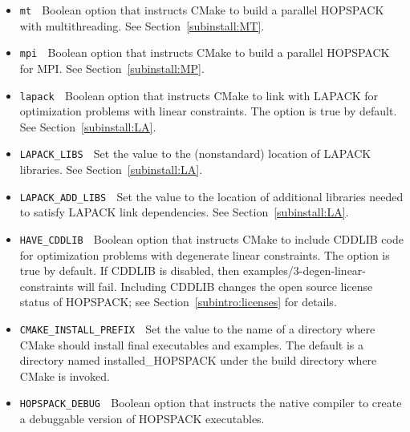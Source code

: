 \begin{itemize}
  \item {\tt mt} $\;$
      Boolean option that instructs CMake to build a parallel HOPSPACK with
      multithreading.  See Section~\ref{subinstall:MT}.
  \item {\tt mpi} $\;$
      Boolean option that instructs CMake to build a parallel HOPSPACK for MPI.
      See Section~\ref{subinstall:MP}.
  \item {\tt lapack} $\;$
      Boolean option that instructs CMake to link with LAPACK for optimization
      problems with linear constraints.  The option is true by default.
      See Section~\ref{subinstall:LA}.
  \item {\tt LAPACK\_LIBS} $\;$
      Set the value to the (nonstandard) location of LAPACK libraries.
      See Section~\ref{subinstall:LA}.
  \item {\tt LAPACK\_ADD\_LIBS} $\;$
      Set the value to the location of additional libraries needed to
      satisfy LAPACK link dependencies.
      See Section~\ref{subinstall:LA}.
  \item {\tt HAVE\_CDDLIB} $\;$
      Boolean option that instructs CMake to include CDDLIB code for
      optimization problems with degenerate linear constraints.  The option
      is true by default.  If CDDLIB is disabled, then
      {\sf examples/3-degen-linear-constraints} will fail.
      Including CDDLIB changes the open source license status of HOPSPACK;
      see Section~\ref{subintro:licenses} for details.
  \item {\tt CMAKE\_INSTALL\_PREFIX} $\;$
      Set the value to the name of a directory where CMake should install
      final executables and examples.  The default is a directory named
      {\sf installed\_HOPSPACK} under the build directory where CMake
      is invoked.
  \item {\tt HOPSPACK\_DEBUG} $\;$
      Boolean option that instructs the native compiler to create
      a debuggable version of HOPSPACK executables.
\end{itemize}
